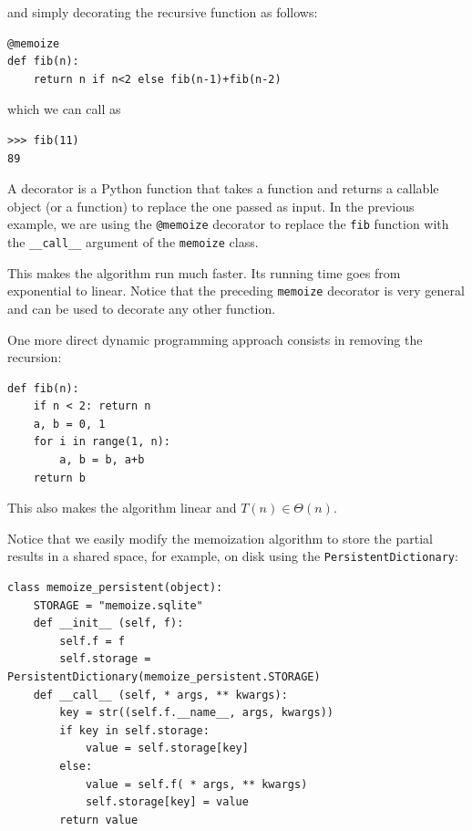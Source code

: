 \documentclass[justified, sixbynine]{tufte-book}
\def\ft{\small\tt}
\theoremstyle{plain}%
\newtheorem * {corollary}{Corollary}
\theoremstyle{definition}
\theoremstyle{remark}
\newtheorem * {remark}{Remark}
\newtheorem * {note}{Note}
\begin{document}
\begin{fullwidth}
and simply decorating the recursive function as follows:

\begin{lstlisting}[caption={in file: {\ft nlib.py}}]
@memoize
def fib(n):
    return n if n<2 else fib(n-1)+fib(n-2)
\end{lstlisting}

which we can call as

\begin{lstlisting}[caption={in file: {\ft nlib.py}}]
>>> fib(11)
89
\end{lstlisting}

A decorator is a Python function that takes a function and returns a callable object (or a function) to replace the one passed as input. In the previous example, we are using the {\ft @memoize} decorator to replace the {\ft fib} function with the {\ft \_\_call\_\_} argument of the {\ft memoize} class.

This makes the algorithm run much faster. Its running time goes from exponential to linear. Notice that the preceding {\ft memoize} decorator is very general and can be used to decorate any other function.

One more direct
dynamic programming approach consists in removing the recursion:

\begin{lstlisting}
def fib(n):
    if n < 2: return n
    a, b = 0, 1
    for i in range(1, n):
        a, b = b, a+b
    return b
\end{lstlisting}

This also makes the algorithm linear and $T(n) \in \Theta(n)$.


Notice that we easily modify the memoization algorithm to store the partial results in a shared space, for example, on disk using the {\ft PersistentDictionary}:

\begin{lstlisting}[caption={in file: {\ft nlib.py}}]
class memoize_persistent(object):
    STORAGE = "memoize.sqlite"
    def __init__ (self, f):
        self.f = f
        self.storage = PersistentDictionary(memoize_persistent.STORAGE)
    def __call__ (self, * args, ** kwargs):
        key = str((self.f.__name__, args, kwargs))
        if key in self.storage:
            value = self.storage[key]
        else:
            value = self.f( * args, ** kwargs)
            self.storage[key] = value
        return value
\end{lstlisting}


\end{fullwidth}
\end{document}
